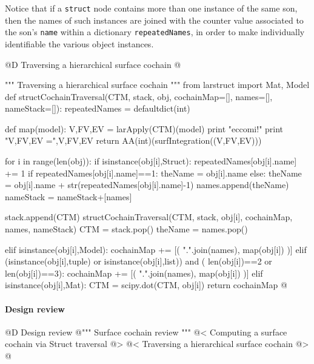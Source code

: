 \documentclass[11pt,oneside]{article}    %
\begin{document}
Notice that if a \texttt{struct} node contains more than one instance of the same son, then the names of such instances are joined with the counter value associated to the son's \texttt{name} within a dictionary \texttt{repeatedNames}, in order to make individually identifiable the various object instances.

@D Traversing a hierarchical surface cochain
@{""" Traversing a hierarchical surface cochain """
from larstruct import Mat, Model
def structCochainTraversal(CTM, stack, obj, cochainMap=[], names=[], nameStack=[]):
    repeatedNames = defaultdict(int)
    
    def map(model):
        V,FV,EV = larApply(CTM)(model)
        print "eccomi!"
        print "V,FV,EV =",V,FV,EV 
        return AA(int)(surfIntegration((V,FV,EV)))
    
    for i in range(len(obj)):
        if isinstance(obj[i],Struct):
            repeatedNames[obj[i].name] += 1
            if repeatedNames[obj[i].name]==1: theName = obj[i].name
            else: theName = obj[i].name + str(repeatedNames[obj[i].name]-1)
            names.append(theName)
            nameStack = nameStack+[names]
            
            stack.append(CTM) 
            structCochainTraversal(CTM, stack, obj[i], cochainMap, names, nameStack)
            CTM = stack.pop()
            theName = names.pop()
            
        elif isinstance(obj[i],Model): 
            cochainMap += [( ".".join(names), map(obj[i]) )]
        elif (isinstance(obj[i],tuple) or isinstance(obj[i],list)) and (
              len(obj[i])==2 or len(obj[i])==3):
            cochainMap += [( ".".join(names), map(obj[i]) )]
        elif isinstance(obj[i],Mat): 
            CTM = scipy.dot(CTM, obj[i])
    return cochainMap
@}


\paragraph{Design review}

@D Design review
@{""" Surface cochain review """
@< Computing a surface cochain via Struct traversal @>
@< Traversing a hierarchical surface cochain @>
@}
\end{document}
